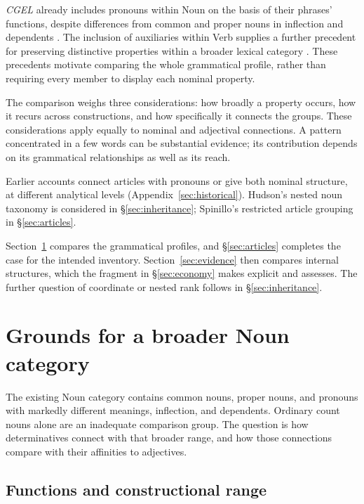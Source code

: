 \documentclass[12pt]{article}
\begin{document}
\textit{CGEL} already includes pronouns within Noun on the basis of their phrases' functions, despite differences from common and proper nouns in inflection and dependents \citep[327--328]{huddleston2002}. The inclusion of auxiliaries within Verb supplies a further precedent for preserving distinctive properties within a broader lexical category \citep{pullumwilson1977}. These precedents motivate comparing the whole grammatical profile, rather than requiring every member to display each nominal property.

The comparison weighs three considerations: how broadly a property occurs, how it recurs across constructions, and how specifically it connects the groups. These considerations apply equally to nominal and adjectival connections. A pattern concentrated in a few words can be substantial evidence; its contribution depends on its grammatical relationships as well as its reach.

Earlier accounts connect articles with pronouns or give both nominal structure, at different analytical levels (Appendix~\ref{sec:historical}). Hudson's nested noun taxonomy is considered in §\ref{sec:inheritance}; Spinillo's restricted article grouping in §\ref{sec:articles}.

Section~\ref{sec:proposal} compares the grammatical profiles, and §\ref{sec:articles} completes the case for the intended inventory. Section~\ref{sec:evidence} then compares internal structures, which the fragment in §\ref{sec:economy} makes explicit and assesses. The further question of coordinate or nested rank follows in §\ref{sec:inheritance}.

\section{Grounds for a broader Noun category}\label{sec:proposal}

The existing Noun category contains common nouns, proper nouns, and pronouns with markedly different meanings, inflection, and dependents. Ordinary count nouns alone are an inadequate comparison group. The question is how determinatives connect with that broader range, and how those connections compare with their affinities to adjectives.

\subsection{Functions and constructional range}\label{sec:independent}
\end{document}
